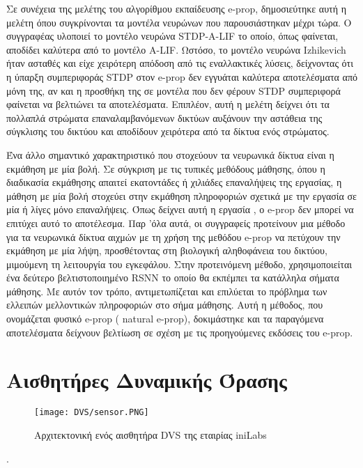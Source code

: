 \documentclass[12pt]{report}
\begin{document}
Σε συνέχεια της μελέτης του αλγορίθμου εκπαίδευσης \textlatin{e-prop}, δημοσιεύτηκε αυτή η μελέτη \cite{Veen2021} όπου συγκρίνονται τα μοντέλα νευρώνων που παρουσιάστηκαν μέχρι τώρα. Ο συγγραφέας υλοποιεί το μοντέλο νευρώνα \textlatin{STDP-A-LIF} το οποίο, όπως φαίνεται, αποδίδει καλύτερα από το μοντέλο \textlatin{A-LIF}. Ωστόσο, το μοντέλο νευρώνα \textlatin{Izhikevich} ήταν ασταθές και είχε χειρότερη απόδοση από τις εναλλακτικές λύσεις, δείχνοντας ότι η ύπαρξη συμπεριφοράς \textlatin{STDP} στον \textlatin{e-prop} δεν εγγυάται καλύτερα αποτελέσματα από μόνη της, αν και η προσθήκη της σε μοντέλα που δεν φέρουν \textlatin{STDP} συμπεριφορά φαίνεται να βελτιώνει τα αποτελέσματα. Επιπλέον, αυτή η μελέτη δείχνει ότι τα πολλαπλά στρώματα επαναλαμβανόμενων δικτύων αυξάνουν την αστάθεια της σύγκλισης του δικτύου και αποδίδουν χειρότερα από τα δίκτυα ενός στρώματος.

Ένα άλλο σημαντικό χαρακτηριστικό που στοχεύουν τα νευρωνικά δίκτυα είναι η εκμάθηση με μία βολή. Σε σύγκριση με τις τυπικές μεθόδους μάθησης, όπου η διαδικασία εκμάθησης απαιτεί εκατοντάδες ή χιλιάδες επαναλήψεις της εργασίας, η μάθηση με μία βολή στοχεύει στην εκμάθηση πληροφοριών σχετικά με την εργασία σε μία ή λίγες μόνο επαναλήψεις. Όπως δείχνει αυτή η εργασία \cite{Scherr2020}, ο \textlatin{e-prop} δεν μπορεί να επιτύχει αυτό το αποτέλεσμα. Παρ 'όλα αυτά, οι συγγραφείς προτείνουν μια μέθοδο για τα νευρωνικά δίκτυα αιχμών με τη χρήση της μεθόδου \textlatin{e-prop} να πετύχουν την εκμάθηση με μία λήψη, προσθέτοντας στη βιολογική αληθοφάνεια του δικτύου, μιμούμενη τη λειτουργία του εγκεφάλου. Στην προτεινόμενη μέθοδο, χρησιμοποιείται ένα δεύτερο βελτιστοποιημένο \textlatin{RSNN} το οποίο θα εκπέμπει τα κατάλληλα σήματα μάθησης. Με αυτόν τον τρόπο, αντιμετωπίζεται και επιλύεται το πρόβλημα των ελλειπών μελλοντικών πληροφοριών στο σήμα μάθησης. Αυτή η μέθοδος, που ονομάζεται φυσικό \textlatin{e-prop ( natural e-prop)}, δοκιμάστηκε και τα παραγόμενα αποτελέσματα δείχνουν βελτίωση σε σχέση με τις προηγούμενες εκδόσεις του \textlatin{e-prop}.

\chapter{Αισθητήρες Δυναμικής Όρασης}

\begin{wrapfigure}{r}{0.25\textwidth} %
    \centering
     \texttt{[image: DVS/sensor.PNG]}
    \caption{Αρχιτεκτονική ενός αισθητήρα \textlatin{DVS} της εταιρίας \textlatin{iniLabs} }
    \label{fig:dvs-sensor}
\end{wrapfigure}.
\end{document}
